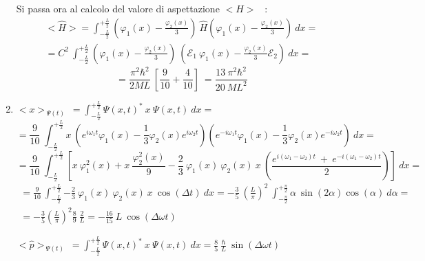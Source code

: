 \documentclass[12pt,twoside,a4]{article}
\begin{document}
\begin{solution}
\begin{enumerate}[label=(\textit{\roman*})]
\bigskip
Si passa ora al calcolo del valore di aspettazione $< \hat{H} > $ \ :
\begin{gather}
  < \hat{H} > = \int_{-\frac{L}{2}}^{+\frac{L}{2}} {\left(\varphi_1(x) - \frac{\varphi_2(x)}{3}\right) \ \hat{H} \left(\varphi_1(x) - \frac{\varphi_2(x)}{3}\right)} \ dx =\\= C^2 \ \int_{-\frac{L}{2}}^{+\frac{L}{2}} {\left(\varphi_1(x) - \frac{\varphi_2(x)}{3}\right) \ \left(\mathcal{E}_1 \ \varphi_1(x) - \frac{\varphi_2(x)}{3} \mathcal{E}_2\right)} \ dx =    
\end{gather}
\begin{equation*}
  = \frac{\pi^2 \hbar^2}{2 M L } \ \left[ \frac{9}{10} + \frac{4}{10}\right] \  = \frac{13 \ \pi^2 \hbar^2}{20 \ M L^2}   
\end{equation*}

\item 

$< x > _{ \ \Psi(t)} \ = \int_{-\frac{L}{2}}^{+\frac{L}{2}} {\Psi(x,t)^\ast \ x \ \Psi(x,t)} \ dx =$
\begin{equation*}
    = \frac{9}{10} \ \int_{-\frac{L}{2}}^{+\frac{L}{2}} { x \ \left(e^{i\omega_1t} \varphi_1(x) - \frac{1}{3} \varphi_2(x) e^{i\omega_2t} \right) \left( e^{-i\omega_1t} \varphi_1(x) - \frac{1}{3} \varphi_2(x) e^{-i\omega_2t}\right)
    } \ dx =         
\end{equation*}
\begin{equation*}
    = \frac{9}{10} \ \int_{-\frac{L}{2}}^{+\frac{L}{2}} { \left[x \ \varphi^2_1(x) + x \ \frac{\varphi^2_2(x)}{9} -\frac{2}{3} \ \varphi_1(x) \ \varphi_2(x) \ x \ \left( \frac{e^{i(\omega_1-\omega_2)t} \ + \ e^{-i(\omega_1 - \omega_2)t} }{2}\right)
   \right] } \ dx =         
\end{equation*}
\begin{gather*}
    = \frac{9}{10} \ \int_{-\frac{L}{2}}^{+\frac{L}{2}} { - \frac{2}{3} \ \varphi_1(x) \ \varphi_2(x) \ x \ \cos{(\Delta t)}} \ dx = -\frac{3}{5} \ \left(\frac{L}{\pi}\right)^2 \   \int_{-\frac{\pi}{2}}^{+\frac{\pi}{2}} {\alpha \ \sin{(2\alpha)} \cos{(\alpha)} } \ d\alpha = \\ =-\frac{3}{5} \left(\frac{L}{\pi}\right)^2 \frac{8}{9} \ \frac{2}{L} = -\frac{16}{15} \ L \ \cos{(\Delta\omega t)}   
\end{gather*}

$< \hat{p} > _{ \ \Psi(t)} \ = \int_{-\frac{L}{2}}^{+\frac{L}{2}} {\Psi(x,t)^\ast \ x \ \Psi(x,t)} \ dx = \frac{8}{5} \ \frac{\hbar}{L} \ \sin{(\Delta\omega t)}$


\end{enumerate}
\end{solution}
\end{document}
